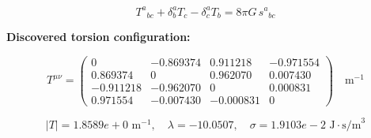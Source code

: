 
\begin{equation}
  T^a{}_{bc} + \delta^a_b T_c - \delta^a_c T_b = 8\pi G \, s^a{}_{bc}
\end{equation}

\textbf{Discovered torsion configuration:}

\begin{equation}
  T^{\mu\nu} = \begin{pmatrix}
    0 & -0.869374 & 0.911218 & -0.971554 \\
    0.869374 & 0 & 0.962070 & 0.007430 \\
    -0.911218 & -0.962070 & 0 & 0.000831 \\
    0.971554 & -0.007430 & -0.000831 & 0
  \end{pmatrix} \quad \text{m}^{-1}
\end{equation}

\begin{equation}
  |T| = 1.8589e+0 \text{ m}^{-1}, \quad
  \lambda = -10.0507, \quad
  \sigma = 1.9103e-2 \text{ J}\cdot\text{s/m}^3
\end{equation}